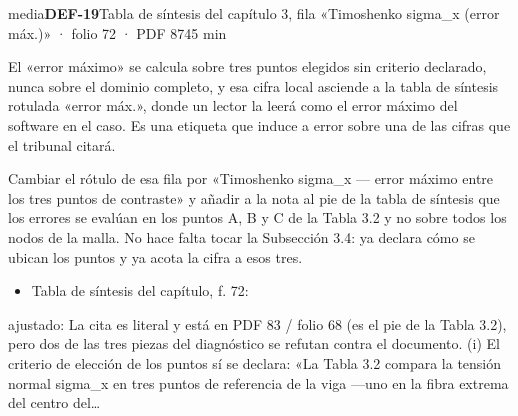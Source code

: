\begin{ficha}{media}{\casilla\textbf{DEF-19}\quad{}\quad Tabla de síntesis del capítulo 3, fila «Timoshenko sigma\_\allowbreak{}x (error máx.)» · folio 72 · PDF 87\hfill 45 min}
\par
{}El «error máximo» se calcula sobre tres puntos elegidos sin criterio declarado, nunca sobre el dominio completo, y esa cifra local asciende a la tabla de síntesis rotulada «error máx.», donde un lector la leerá como el error máximo del software en el caso. Es una etiqueta que induce a error sobre una de las cifras que el tribunal citará.\par
{}Cambiar el rótulo de esa fila por «Timoshenko sigma\_\allowbreak{}x — error máximo entre los tres puntos de contraste» y añadir a la nota al pie de la tabla de síntesis que los errores se evalúan en los puntos A, B y C de la Tabla 3.2 y no sobre todos los nodos de la malla. No hace falta tocar la Subsección 3.4: ya declara cómo se ubican los puntos y ya acota la cifra a esos tres.\par
{}\begin{itemize}[leftmargin=1.2em,itemsep=1pt,topsep=1pt]
\item {\small Tabla de síntesis del capítulo, f. 72: }
\end{itemize}
{\footnotesize\color{gris}ajustado: La cita es literal y está en PDF 83 /\allowbreak{} folio 68 (es el pie de la Tabla 3.2), pero dos de las tres piezas del diagnóstico se refutan contra el documento. (i) El criterio de elección de los puntos sí se declara: «La Tabla 3.2 compara la tensión normal sigma\_\allowbreak{}x en tres puntos de referencia de la viga —uno en la fibra extrema del centro del…\par}
\end{ficha}
